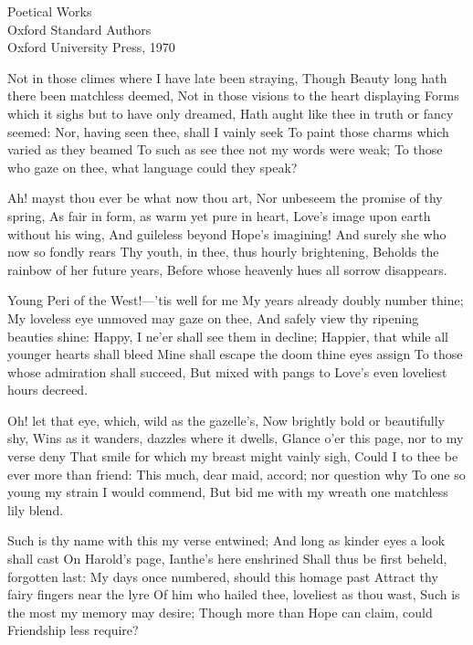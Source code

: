 \documentclass[10pt,twocolumn]{book}
\begin{document}
 

\onecolumn

              {Poetical Works\\
               Oxford Standard Authors\\
               Oxford University Press, 1970}


\spatium {5\leading}
\cleardoublepage
\twocolumn

\Versus
\pagestyle {maintext}


{

   Not in those climes where I have late been straying,
   Though Beauty long hath there been matchless deemed,
   Not in those visions to the heart displaying 
   Forms which it sighs but to have only dreamed, 
   Hath aught like thee in truth or fancy seemed: 
   Nor, having seen thee, shall I vainly seek
   To paint those charms which varied as they beamed\textemdash
   To such as see thee not my words were weak;
To those who gaze on thee, what language could they speak?

   Ah! mayst thou ever be what now thou art,
   Nor unbeseem the promise of thy spring,
   As fair in form, as warm yet pure in heart,
   Love's image upon earth without his wing,
   And guileless beyond Hope's imagining!
   And surely she who now so fondly rears
   Thy youth, in thee, thus hourly brightening,
   Beholds the rainbow of her future years,
Before whose heavenly hues all sorrow disappears.

   Young Peri of the West!---'tis well for me
   My years already doubly number thine;
   My loveless eye unmoved may gaze on thee,
   And safely view thy ripening beauties shine:
   Happy, I ne'er shall see them in decline;
   Happier, that while all younger hearts shall bleed
   Mine shall escape the doom thine eyes assign
   To those whose admiration shall succeed,
But mixed with pangs to Love's even loveliest hours decreed.

   Oh! let that eye, which, wild as the gazelle's,
   Now brightly bold or beautifully shy,
   Wins as it wanders, dazzles where it dwells,
   Glance o'er this page, nor to my verse deny
   That smile for which my breast might vainly sigh,
   Could I to thee be ever more than friend:
   This much, dear maid, accord; nor question why
   To one so young my strain I would commend,
But bid me with my wreath one matchless lily blend.

   Such is thy name with this my verse entwined;
   And long as kinder eyes a look shall cast
   On Harold's page, Ianthe's here enshrined
   Shall thus be first beheld, forgotten last:
   My days once numbered, should this homage past
   Attract thy fairy fingers near the lyre
   Of him who hailed thee, loveliest as thou wast,
   Such is the most my memory may desire;
Though more than Hope can claim, could Friendship less require?
}
\numerus{}
\end{document}
